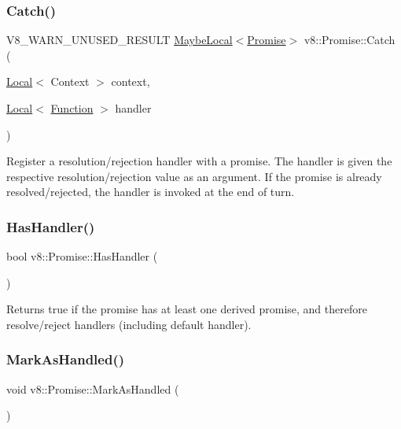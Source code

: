 \subsubsection{\texorpdfstring{Catch()}{Catch()}}
{\footnotesize\ttfamily V8\+\_\+\+W\+A\+R\+N\+\_\+\+U\+N\+U\+S\+E\+D\+\_\+\+R\+E\+S\+U\+LT \mbox{\hyperlink{classv8_1_1MaybeLocal}{Maybe\+Local}}$<$\mbox{\hyperlink{classv8_1_1Promise}{Promise}}$>$ v8\+::\+Promise\+::\+Catch (\begin{DoxyParamCaption}\item[{\mbox{\hyperlink{classv8_1_1Local}{Local}}$<$ Context $>$}]{context,  }\item[{\mbox{\hyperlink{classv8_1_1Local}{Local}}$<$ \mbox{\hyperlink{classv8_1_1Function}{Function}} $>$}]{handler }\end{DoxyParamCaption})}

Register a resolution/rejection handler with a promise. The handler is given the respective resolution/rejection value as an argument. If the promise is already resolved/rejected, the handler is invoked at the end of turn. \mbox{\label{classv8_1_1Promise_aeea8bdfdbe2291632d7f0d45394c1722}} 
\subsubsection{\texorpdfstring{Has\+Handler()}{HasHandler()}}
{\footnotesize\ttfamily bool v8\+::\+Promise\+::\+Has\+Handler (\begin{DoxyParamCaption}{ }\end{DoxyParamCaption})}

Returns true if the promise has at least one derived promise, and therefore resolve/reject handlers (including default handler). \mbox{\label{classv8_1_1Promise_a17d6e3484dc051e1c05a31fd285b0f9f}} 
\subsubsection{\texorpdfstring{Mark\+As\+Handled()}{MarkAsHandled()}}
{\footnotesize\ttfamily void v8\+::\+Promise\+::\+Mark\+As\+Handled (\begin{DoxyParamCaption}{ }\end{DoxyParamCaption})}

